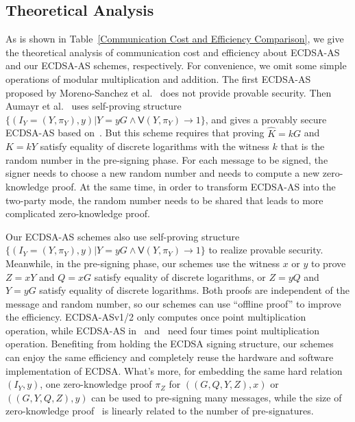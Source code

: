 \documentclass{llncs}
\begin{document}
\subsection{Theoretical Analysis}
As is shown in Table~\ref{Communication Cost and Efficiency Comparison}, we give the theoretical analysis of communication cost and efficiency about ECDSA-AS~\cite{Moreno-Sanchez2018,AumayrEEFHMMR20} and our ECDSA-AS schemes, respectively. For convenience, we omit some simple operations of modular multiplication and addition. The first ECDSA-AS proposed by Moreno-Sanchez et al.~\cite{Moreno-Sanchez2018} does not provide provable security. Then Aumayr et al.~\cite{AumayrEEFHMMR20} uses self-proving structure $\{(I_Y = (Y, \pi_Y), y) | Y = yG \wedge \mathsf{V}(Y, \pi_Y)\rightarrow 1\}$, and gives a provably secure ECDSA-AS based on~\cite{Moreno-Sanchez2018}. But this scheme requires that proving $\hat{K}=kG$ and $K=kY$ satisfy equality of discrete logarithms with the witness $k$ that is the random number in the pre-signing phase. For each message to be signed, the signer needs to choose a new random number and needs to compute a new zero-knowledge proof. At the same time, in order to transform ECDSA-AS into the two-party mode, the random number needs to be shared that leads to more complicated zero-knowledge proof.

Our ECDSA-AS schemes also use self-proving structure $\{(I_Y = (Y, \pi_Y), y) | Y = yG \wedge \mathsf{V}(Y, \pi_Y)\rightarrow 1\}$ to realize provable security. Meanwhile, in the pre-signing phase, our schemes use the witness $x$ or $y$ to prove $Z=xY$ and $Q=xG$ satisfy equality of discrete logarithms, or $Z=yQ$ and $Y=yG$ satisfy equality of discrete logarithms. Both proofs are independent of the message and random number, so our schemes can use ``offline proof'' to improve the efficiency. ECDSA-ASv1/2 only computes once point multiplication operation, while ECDSA-AS in~\cite{Moreno-Sanchez2018} and~\cite{AumayrEEFHMMR20} need four times point multiplication operation. Benefiting from holding the ECDSA signing structure, our schemes can enjoy the same efficiency and completely reuse the hardware and software implementation of ECDSA. What's more, for embedding the same hard relation $(I_Y, y)$, one zero-knowledge proof $\pi_Z$ for $((G, Q, Y, Z), x)$ or $((G, Y, Q, Z), y)$ can be used to pre-signing many messages, while the size of zero-knowledge proof~\cite{Moreno-Sanchez2018,AumayrEEFHMMR20} is linearly related to the number of pre-signatures.
\end{document}
